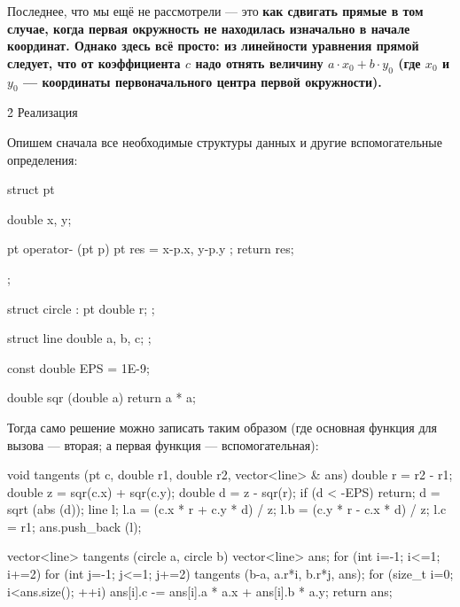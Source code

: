 Последнее, что мы ещё не рассмотрели --- это \bf{как сдвигать прямые} в том случае, когда первая окружность не находилась изначально в начале координат. Однако здесь всё просто: из линейности уравнения прямой следует, что от коэффициента $c$ надо отнять величину $a \cdot x_0 + b \cdot y_0$ (где $x_0$ и $y_0$ --- координаты первоначального центра первой окружности).


\h2{ Реализация }

Опишем сначала все необходимые структуры данных и другие вспомогательные определения:

\code
struct pt {
	double x, y;

	pt operator- (pt p) {
		pt res = { x-p.x, y-p.y };
		return res;
	}
};

struct circle : pt {
	double r;
};

struct line {
	double a, b, c;
};

const double EPS = 1E-9;

double sqr (double a) {
	return a * a;
}
\endcode

Тогда само решение можно записать таким образом (где основная функция для вызова --- вторая; а первая функция --- вспомогательная):

\code
void tangents (pt c, double r1, double r2, vector<line> & ans) {
	double r = r2 - r1;
	double z = sqr(c.x) + sqr(c.y);
	double d = z - sqr(r);
	if (d < -EPS)  return;
	d = sqrt (abs (d));
	line l;
	l.a = (c.x * r + c.y * d) / z;
	l.b = (c.y * r - c.x * d) / z;
	l.c = r1;
	ans.push_back (l);
}

vector<line> tangents (circle a, circle b) {
	vector<line> ans;
	for (int i=-1; i<=1; i+=2)
		for (int j=-1; j<=1; j+=2)
			tangents (b-a, a.r*i, b.r*j, ans);
	for (size_t i=0; i<ans.size(); ++i)
		ans[i].c -= ans[i].a * a.x + ans[i].b * a.y;
	return ans;
}
\endcode




